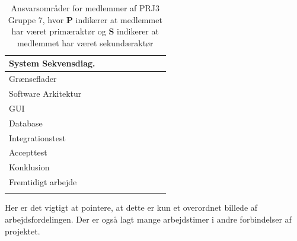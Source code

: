 \documentclass[a4paper,12pt,fleqn,oneside]{article}
\begin{document}
\begin{longtable}{|L{0.2\textwidth}|L{0.082\textwidth}|L{0.08\textwidth}|L{0.08\textwidth}|L{0.08\textwidth}|L{0.08\textwidth}|L{0.08\textwidth}|L{0.08\textwidth}|L{0.08\textwidth}|}
        System Sekvensdiag.     &               &               &               &               &               &               &               &                \\ \hline
        Grænseflader            &               &               &               &               &               &               &               &                \\ \hline
        Software Arkitektur     &               &               &               &               &               &               &               &                \\ \hline
        GUI                     &               &               &               &               &               &               &               &                \\ \hline
        Database                &               &               &               &               &               &               &               &                \\ \hline
        Integrationstest        &               &               &               &               &               &               &               &                \\ \hline
        Accepttest              &               &               &               &               &               &               &               &                \\ \hline
        Konklusion              &               &               &               &               &               &               &               &                \\ \hline 
        Fremtidigt arbejde      &               &               &               &               &               &               &               &                \\ \hline
\caption{Ansvarsområder for medlemmer af PRJ3 Gruppe 7, hvor \textbf{P} indikerer at medlemmet har været primæraktør og \textbf{S} indikerer at medlemmet har været sekundæraktør}
\end{longtable}
Her er det vigtigt at pointere, at dette er kun et overordnet billede af arbejdsfordelingen. Der er også lagt mange arbejdstimer i andre forbindelser af projektet. 
\end{document}
